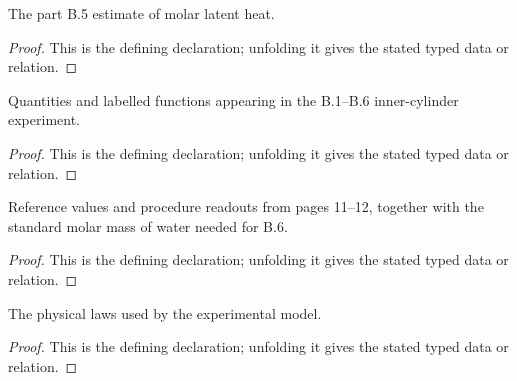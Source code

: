 \begin{definition}[MolarLatentHeatEstimate]
  \label{decl:physics:IPhO_2026_4_B_6:MolarLatentHeatEstimate}
  The part B.5 estimate of molar latent heat.
\end{definition}
\begin{proof}
  This is the defining declaration; unfolding it gives the stated typed data or relation.
\end{proof}

\begin{definition}[VaporizationExperiment]
  \label{decl:physics:IPhO_2026_4_B_6:VaporizationExperiment}
  Quantities and labelled functions appearing in the B.1--B.6 inner-cylinder experiment.
\end{definition}
\begin{proof}
  This is the defining declaration; unfolding it gives the stated typed data or relation.
\end{proof}

\begin{definition}[HasReferenceAndProcedureData]
  \label{decl:physics:IPhO_2026_4_B_6:HasReferenceAndProcedureData}
  Reference values and procedure readouts from pages 11--12, together with the standard molar mass of water needed for B.6.
\end{definition}
\begin{proof}
  This is the defining declaration; unfolding it gives the stated typed data or relation.
\end{proof}

\begin{definition}[GoverningLaws]
  \label{decl:physics:IPhO_2026_4_B_6:GoverningLaws}
  The physical laws used by the experimental model.
\end{definition}
\begin{proof}
  This is the defining declaration; unfolding it gives the stated typed data or relation.
\end{proof}

